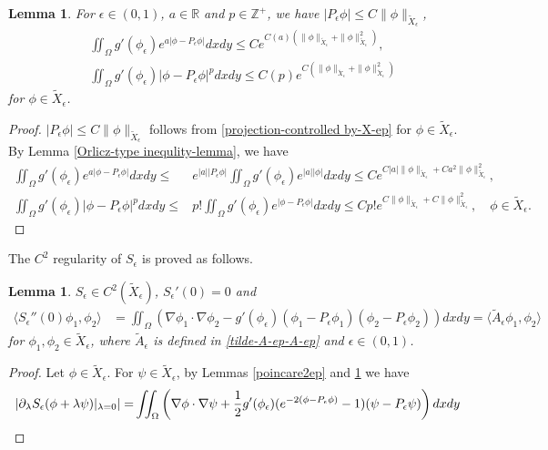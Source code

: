 \documentclass[1 [leqno, 11pt]{amsart}
\numberwithin{equation}{section}
\let\ep=\epsilon
\newtheorem{lemma}[Theorem]{Lemma}
\newtheorem{Lemma}[Theorem]{Lemma}
\begin{document}
\begin{CJK*}{GBK}{song}
\begin{lemma}\label{e-p-c-e-x}
For $\ep\in(0,1)$, $a\in\mathbb{R}$ and $p\in\mathbb{Z}^+$, we have $|P_\ep\phi|\leq C\|\phi\|_{\tilde X_\ep}$,
\begin{align*}
&\iint_\Omega g'(\phi_\ep) e^ {a|\phi-P_\ep\phi|} dxdy \leq  C e^{C(a)\left(\|\phi\|_{\tilde{X}_\ep}+\|\phi\|_{\tilde{X}_\ep}^2\right)},\\
&\iint_\Omega g'(\phi_\ep) |\phi-P_\ep\phi|^p dxdy  \leq  C(p) e^{C\left(\|\phi\|_{\tilde{X}_\ep}+\|\phi\|_{\tilde{X}_\ep}^2\right)}
\end{align*}
for $\phi \in \tilde{X}_\ep$.
\end{lemma}
\begin{proof}
$|P_\ep\phi|\leq C\|\phi\|_{\tilde X_\ep}$ follows from
\eqref{projection-controlled by-X-ep} for $\phi \in \tilde{X}_\ep$.
By Lemma  \ref{Orlicz-type inequlity-lemma}, we have
\begin{align*}
\iint_\Omega g'(\phi_\ep) e^ {a|\phi-P_\ep\phi|} dxdy \leq& e^ {|a||P_\ep\phi|} \iint_\Omega g'(\phi_\ep) e^ {|a||\phi|} dxdy\leq  Ce^ {C|a|\|\phi\|_{\tilde X_\ep}+Ca^2\|\phi\|_{\tilde{X}_\ep}^2},\\
\iint_\Omega g'(\phi_\ep) |\phi-P_\ep\phi|^p dxdy \leq& p!\iint_\Omega g'(\phi_\ep) e^{|\phi-P_\ep\phi|} dxdy \leq  Cp! e^ {C\|\phi\|_{\tilde X_\ep}+C\|\phi\|_{\tilde{X}_\ep}^2},\quad \phi \in \tilde{X}_\ep.
\end{align*}
\end{proof}
The $C^2$ regularity of   $S_\ep$ is proved as follows.
\begin{Lemma}\label{C2-mhd}
$S_\ep\in C^2(\tilde X_\ep)$, $S_\ep'(0) = 0$ and
\begin{align*}
\langle S_\ep''(0)\phi_1,\phi_2 \rangle&=  \iint_{\Omega}\left(\nabla\phi_1\cdot\nabla\phi_2- g'(\phi_\ep) (\phi_1-P_\ep\phi_1)(\phi_2-P_\ep\phi_2)\right)dxdy=\langle \tilde A_\ep \phi_1,\phi_2 \rangle
\end{align*}
for $\phi_1,\phi_2\in\tilde X_\ep$,
where   $\tilde{A}_\ep$ is defined in \eqref{tilde-A-ep-A-ep} and $\ep\in(0,1)$.
\end{Lemma}
\begin{proof}
Let $\phi\in \tilde{X}_\ep$. For  $\psi \in \tilde{X}_\ep$, by Lemmas  \ref{poincare2ep} and \ref{e-p-c-e-x} we have
\begin{align*}
|\partial_\lambda S_\ep(\phi + \lambda \psi)|_{\lambda = 0}|
= & \iint_\Omega  \left(\nabla\phi\cdot\nabla\psi+{1\over2}  g'(\phi_\ep) (e^{-2(\phi-P_\ep\phi)}-1)(\psi-P_\ep\psi) \right)dxdy\\

\end{align*}
\end{proof}
\end{CJK*}
\end{document}
